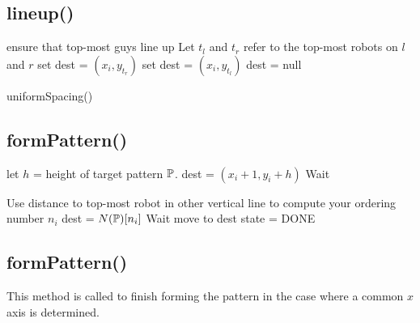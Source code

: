 \documentclass[preprint,10pt]{elsarticle}
\begin{document}

\subsection{lineup()} 
	\begin{algorithm}[H]
	\begin{algorithmic}[1]
		
		\Comment ensure that top-most guys line up
		\State Let $t_l$ and $t_r$ refer to the top-most robots on $l$ and $r$
			\State set dest = $(x_i, y_{t_r})$
			\State set dest = $(x_i, y_{t_l})$
		\Else 
			\State dest = null
		\EndIf

		\State uniformSpacing()
	\EndProcedure
	\end{algorithmic}
	\end{algorithm}

\subsection{formPattern()} 
	\begin{algorithm}[H]
	\begin{algorithmic}[1]

			\State let $h$ = height of target pattern $\mathbb{P}$.
			\State dest = $(x_i + 1, y_i + h)$
		\EndIf
			Wait
		\EndWhile

		\State Use distance to top-most robot in other vertical line to compute your 
		ordering number $n_i$
		\State dest = $N(\mathbb{P})[n_i]$
			Wait
		\EndWhile
		\State move to dest
		state = DONE

	\EndProcedure
	\end{algorithmic}
	\end{algorithm}
\subsection{formPattern()} 
	This method is called to finish forming the pattern in the case where
	a common $x$ axis is determined.
\begin{algorithm}[H]
\begin{algorithmic}[1]
			
		\EndCase
	\EndSwitch
\EndProcedure
\end{algorithmic}
\end{algorithm}
\end{document}
